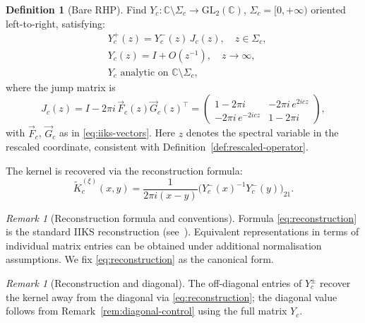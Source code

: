 \documentclass[12pt,a4paper]{amsart}
\theoremstyle{definition}
\newtheorem{definition}[theorem]{Definition}
\theoremstyle{remark}
\newtheorem{remark}[theorem]{Remark}
\begin{document}
\begin{definition}[Bare RHP]
\label{def:bare-rhp}
Find $Y_c:\mathbb{C}\setminus\Sigma_c\to\mathrm{GL}_2(\mathbb{C})$,
$\Sigma_c=[0,+\infty)$ oriented left-to-right, satisfying:
\begin{align}
  &Y_c^+(z)=Y_c^-(z)\,J_c(z),\quad z\in\Sigma_c,\label{eq:rhp-jump}\\
  &Y_c(z)=I+O(z^{-1}),\quad z\to\infty,\label{eq:rhp-norm}\\
  &Y_c\text{ analytic on }\mathbb{C}\setminus\Sigma_c,\label{eq:rhp-anal}
\end{align}
where the jump matrix is
\begin{equation}\label{eq:jump-explicit}
  J_c(z)
  = I - 2\pi i\,\vec{F}_c(z)\vec{G}_c(z)^\top
  = \begin{pmatrix}
      1 - 2\pi i & -2\pi i\,e^{2icz} \\
      -2\pi i\,e^{-2icz} & 1 - 2\pi i
    \end{pmatrix},
\end{equation}
with $\vec{F}_c$, $\vec{G}_c$ as in \eqref{eq:iiks-vectors}.
Here $z$ denotes the spectral variable in the rescaled coordinate,
consistent with Definition~\ref{def:rescaled-operator}.

The kernel is recovered via the reconstruction formula:
\begin{equation}\label{eq:reconstruction}
  \widetilde K_c^{(\xi)}(x,y)
  = \frac{1}{2\pi i (x-y)}
    \bigl( Y_c^-(x)^{-1} Y_c^-(y) \bigr)_{21}.
\end{equation}
\end{definition}

\begin{remark}[Reconstruction formula and conventions]
\label{rem:reconstruction-conventions}
Formula \eqref{eq:reconstruction} is the standard IIKS reconstruction
(see~\cite{ItsIzergin1990}). Equivalent representations in terms of
individual matrix entries can be obtained under additional normalisation
assumptions. We fix \eqref{eq:reconstruction} as the canonical form.
\end{remark}

\begin{remark}[Reconstruction and diagonal]
\label{rem:reconstruction-diagonal}
The off-diagonal entries of $Y_c^\pm$ recover the kernel away from the
diagonal via \eqref{eq:reconstruction}; the diagonal value follows from
Remark~\ref{rem:diagonal-control} using the full matrix $Y_c$.
\end{remark}
\end{document}
